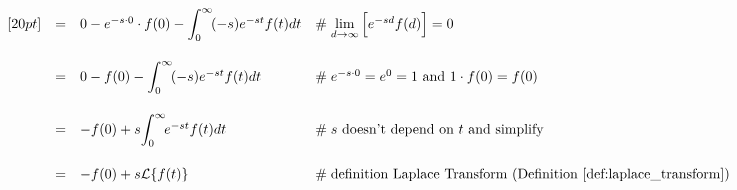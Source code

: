 \documentclass{article}
\theoremstyle{definition}
\begin{document}
\begin{equation*}
\begin{array}{lllll}
[20pt]                                                                                                                                                                                              %
&=& 0  - e^{-s \cdot 0} \cdot f(0)  - \mathlarger{\int}^\infty_0 \!  (-s) e^{-st}  f(t) dt                                                                          &\mathrel{\#} \lim\limits_{d \to \infty}\Big [e^{-sd} f(d) \Big ] = 0                                         \\
[20pt]                                                                                                                                                                                              %
&=& 0 - f(0) - \mathlarger{\int}^\infty_0 \!  (-s) e^{-st}  f(t) dt                                                                                                           &\mathrel{\#} e^{-s \cdot 0} = e^0 = 1 \text{ and } 1 \cdot f(0) = f(0)                                  \\
[20pt]                                                                                                                                                                                              %
&=& -f(0) + s \mathlarger{\int}^\infty_0 \!  e^{-st}  f(t) dt                                                                                                                  &\mathrel{\#} \text{$s$ doesn't depend on $t$ and simplify}                                             \\
[20pt]                                                                                                                                                                                              %
&=& -f(0) + s \mathcal{L}\{f(t)\}                                                                                                                                                        &\mathrel{\#} \text{definition Laplace Transform (Definition \ref{def:laplace_transform})} \\ 

\end{array}
\end{equation*}
\end{document}
